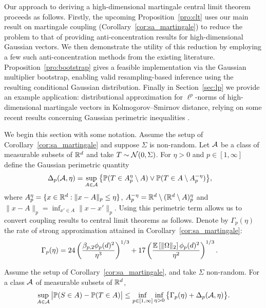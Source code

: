 Our approach to deriving a high-dimensional martingale central limit theorem
proceeds as follows. Firstly, the upcoming Proposition~\ref{pro:clt} uses our
main result on martingale coupling (Corollary~\ref{cor:sa_martingale}) to
reduce the problem to that of providing anti-concentration results for
high-dimensional Gaussian vectors. We then demonstrate the utility of this
reduction by employing a few such anti-concentration methods from the existing
literature. Proposition~\ref{pro:bootstrap} gives a feasible implementation via
the Gaussian multiplier bootstrap, enabling valid
resampling-based inference using
the resulting conditional Gaussian distribution. Finally in
Section~\ref{sec:lp} we provide an example application: distributional
approximation for $\ell^p$-norms of high-dimensional martingale vectors
in Kolmogorov--Smirnov distance, relying on some recent results
concerning Gaussian perimetric inequalities
\citep{nazarov2003maximal,kozbur2021dimension,
giessing2023anti,chernozhukov2017detailed}.

We begin this section with some notation. Assume the setup of
Corollary~\ref{cor:sa_martingale} and suppose $\Sigma$ is
non-random. Let $\mathcal{A}$ be a class of measurable subsets of
$\mathbb{R}^d$ and take $T \sim \mathcal{N}(0, \Sigma)$.
For $\eta>0$ and $p \in [1, \infty]$ define the Gaussian perimetric quantity
%
\begin{align*}
  \Delta_p(\mathcal{A}, \eta)
  &=
  \sup_{A\in \mathcal{A}}
  \big\{\mathbb{P}(T\in A_p^\eta\setminus A)
  \vee \mathbb{P}(T\in A \setminus A_p^{-\eta})\big\},
\end{align*}
%
where $A_p^\eta = \{x \in \mathbb{R}^d : \|x - A\|_p \leq \eta\}$,
$A_p^{-\eta} = \mathbb{R}^d \setminus (\mathbb{R}^d \setminus A)_p^\eta$
and $\|x - A\|_p = \inf_{x' \in A} \|x - x'\|_p$.
Using this perimetric term allows us to convert coupling results
to central limit theorems as follows.
Denote by $\Gamma_p(\eta)$ the rate of strong approximation attained in
Corollary~\ref{cor:sa_martingale}:
%
\begin{align*}
  \Gamma_p(\eta)
  &=
  24 \left(
    \frac{\beta_{p,2} \phi_p(d)^2}{\eta^3}
  \right)^{1/3}
  + 17 \left(
    \frac{\mathbb{E} \left[ \|\Omega\|_2 \right] \phi_p(d)^2}{\eta^2}
  \right)^{1/3}.
\end{align*}

\begin{proposition}%
  \label{pro:clt}

  Assume the setup of Corollary~\ref{cor:sa_martingale},
  and take $\Sigma$ non-random.
  For a class $\mathcal{A}$ of measurable subsets of $\mathbb{R}^d$,
  \begin{equation}%
    \label{eq:high_dim_clt}
    \sup_{A\in \cA}
    \big|\P(S\in A) -\P(T\in A)\big|
    \leq \inf_{p \in [1, \infty]} \inf_{\eta>0}
    \big\{\Gamma_p(\eta) + \Delta_p(\cA, \eta) \big\}.
  \end{equation}
\end{proposition}

